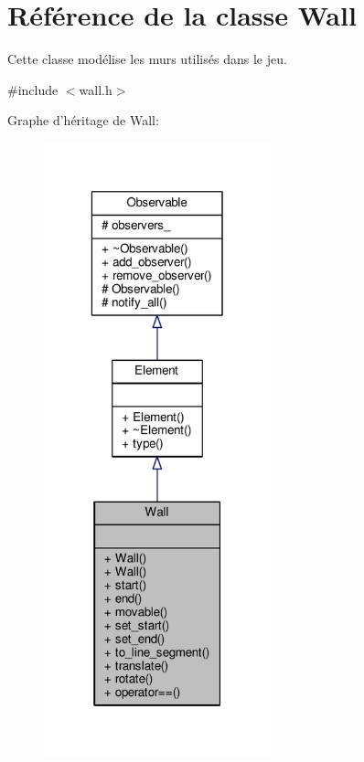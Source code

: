 \hypertarget{classWall}{\section{Référence de la classe Wall}
\label{classWall}
}


Cette classe modélise les murs utilisés dans le jeu.  




{\ttfamily \#include $<$wall.\+h$>$}



Graphe d'héritage de Wall\+:
\nopagebreak
\begin{figure}[H]
\begin{center}
\leavevmode
\includegraphics[width=186pt]{de/d28/classWall__inherit__graph}
\end{center}
\end{figure}


